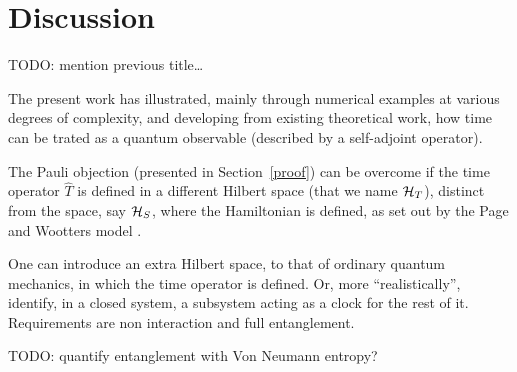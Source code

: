 \section{Discussion}

TODO: mention previous title\dots

The present work has illustrated,
mainly through numerical examples
at various degrees of complexity,
and developing from existing theoretical work,
how time can be trated as a quantum observable
(described by a self-adjoint operator).

The Pauli objection (presented in Section~\ref{proof})
can be overcome if the time operator $\hat{T}$
is defined in a different Hilbert space (that we name $\mathcal{H}_T$),
distinct from
the space, say $\mathcal{H}_S$, where the Hamiltonian is defined,
as set out by the Page and Wootters model
\parencite{PageWootters, Lloyd:Time, Marletto:Evolution, Maccone:QMOT, Maccone:Pauli}.

One can introduce an extra Hilbert space, to that of ordinary quantum mechanics,
in which the time operator is defined.
Or, more ``realistically'', identify, in a closed system, a subsystem
acting as a clock for the rest of it. Requirements are non interaction and
full entanglement.

TODO: quantify entanglement with Von Neumann entropy?
